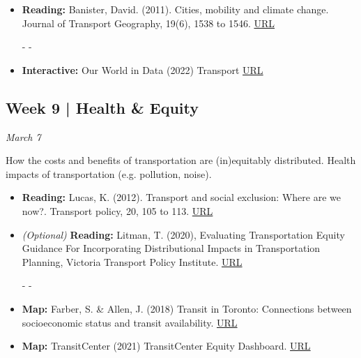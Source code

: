 \documentclass[11pt]{article}
\begin{document}
	\begin{itemize}
		\item \textbf{Reading:} Banister, David. (2011). Cities, mobility and climate change. Journal of Transport
		Geography, 19(6), 1538 to 1546. \href{https://doi.org/10.1016/j.jtrangeo.2011.03.009}{URL}
		
		- -
		
		\item \textbf{Interactive:} Our World in Data (2022) Transport \href{https://ourworldindata.org/transport}{URL}
	\end{itemize}

	
	
	
	
	\subsection*{Week 9 | Health \& Equity}
	
	\textit{March 7}
	
	How the costs and benefits of transportation are (in)equitably distributed. Health impacts of transportation (e.g. pollution, noise).
	
	\begin{itemize}
		\item \textbf{Reading:} Lucas, K. (2012). Transport and social exclusion: Where are we now?. Transport policy, 20, 105 to 113. \href{https://doi.org/10.1016/j.tranpol.2012.01.013}{URL}
		
		\item \textit{(Optional)} \textbf{Reading:} Litman, T. (2020), Evaluating Transportation Equity Guidance For Incorporating Distributional Impacts in Transportation Planning, Victoria Transport Policy Institute. \href{https://vtpi.org/equity.pdf}{URL}
		
		- - 
		
		\item \textbf{Map:} Farber, S. \& Allen, J. (2018) Transit in Toronto: Connections between socioeconomic status and transit availability.  \href{http://edu.maps.arcgis.com/apps/Cascade/index.html?appid=58618c037f344aaaada20b0c894e011c}{URL}
		
		\item \textbf{Map:} TransitCenter (2021) TransitCenter Equity Dashboard. \href{https://dashboard.transitcenter.org/}{URL}
		
		
	\end{itemize}
	
\end{document}
